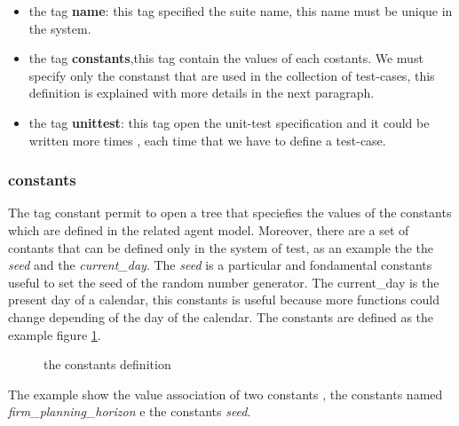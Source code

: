 \documentclass[a4paper,10pt]{article}
\begin{document}
\begin{itemize}
\item the tag \textbf{name}: this tag specified the suite name, this name must be unique in the system.
\item the tag \textbf{constants},this tag contain the values of each costants. We must specify only the constanst that are used in the collection of test-cases, this definition is explained with more details in the next paragraph.
\item the tag \textbf{unittest}: this tag open the unit-test specification and it could be written more times , each time that we have to define a test-case.
\end{itemize}
\subsubsection{constants}
The tag constant permit to open a tree that speciefies the  values of the constants which are defined in the related agent model. Moreover, there are a set of contants that can be defined only in the system of test, as an example the the \textit{seed} and the \textit{current\_day}. The \textit{seed} is a particular and fondamental constants useful to set the seed of the random number generator. The current\_day is the present day of a calendar, this constants is useful because more functions could change depending of the day of the calendar.
The constants are defined as the example figure \ref{fig:fig3}.
\begin{figure}
\label{fig:fig3}

\caption{the constants definition }
\end{figure}
The example show the value association of two constants , the constants named \textit{firm\_planning\_horizon } e the constants \textit{seed}. 
\end{document}

